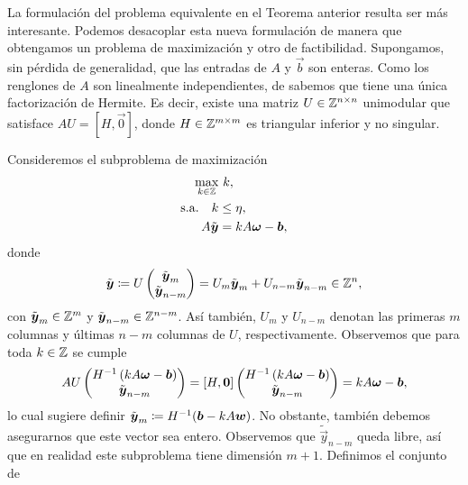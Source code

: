 La formulación del problema equivalente en el Teorema anterior resulta ser más interesante. Podemos
desacoplar esta nueva formulación de manera que obtengamos un problema de maximización y otro de
factibilidad. Supongamos, sin pérdida de generalidad, que las entradas de $A$ y $\vec{b}$ son
enteras. Como los renglones de $A$ son linealmente independientes, de \cite{alex} sabemos que tiene
una única factorización de Hermite. Es decir, existe una matriz $U \in \mathbb{Z}^{n \times n}$ unimodular
que satisface $AU = [H, \vec{0}]$, donde $H \in \mathbb{Z}^{m \times m}$ es triangular inferior y no
singular.

Consideremos el subproblema de maximización
\begin{subequations}
	\label{subformulation:lattice}
	\begin{align}
		\max_{k \in \mathbb{Z}}
			& ~ k, \\
		\text{s.a.} \quad
		k &\leq \eta, \\
			A\tilde{\boldsymbol{y}} &= kA\boldsymbol{\omega} - \boldsymbol{b},
	\end{align}
\end{subequations}
donde 
\begin{equation*}
	\tilde{\boldsymbol{y}} \coloneq U \begin{pmatrix} \tilde{\boldsymbol{y}}_m \\ \tilde{\boldsymbol{y}}_{n-m} \end{pmatrix}
	= U_m\tilde{\boldsymbol{y}}_m + U_{n-m}\tilde{\boldsymbol{y}}_{n-m} \in \mathbb{Z}^n,
\end{equation*}
con $\tilde{\boldsymbol{y}}_m \in \mathbb{Z}^m$ y $\tilde{\boldsymbol{y}}_{n-m} \in \mathbb{Z}^{n-m}$. Así también, $U_m$ y
$U_{n-m}$ denotan las primeras $m$ columnas y últimas $n - m$ columnas de $U$, respectivamente.
Observemos que para toda $k \in \mathbb{Z}$ se cumple
\begin{equation}
	AU \begin{pmatrix} H^{-1}\left(kA\boldsymbol{\omega} - \boldsymbol{b}\right) \\ \tilde{\boldsymbol{y}}_{n-m} \end{pmatrix}
	=
	[H, \boldsymbol{0}] \begin{pmatrix} H^{-1}\left(kA\boldsymbol{\omega} - \boldsymbol{b}\right) \\ \tilde{\boldsymbol{y}}_{n-m} \end{pmatrix}
	= kA\boldsymbol{\omega} - \boldsymbol{b},
\end{equation}
lo cual sugiere definir $\tilde{\boldsymbol{y}}_m \coloneq H^{-1}(\boldsymbol{b} - kA\boldsymbol{w})$. No obstante,
también debemos asegurarnos que este vector sea entero. Observemos que $\tilde{\vec{y}}_{n-m}$ queda
libre, así que en realidad este subproblema tiene dimensión $m + 1$. Definimos el conjunto de
